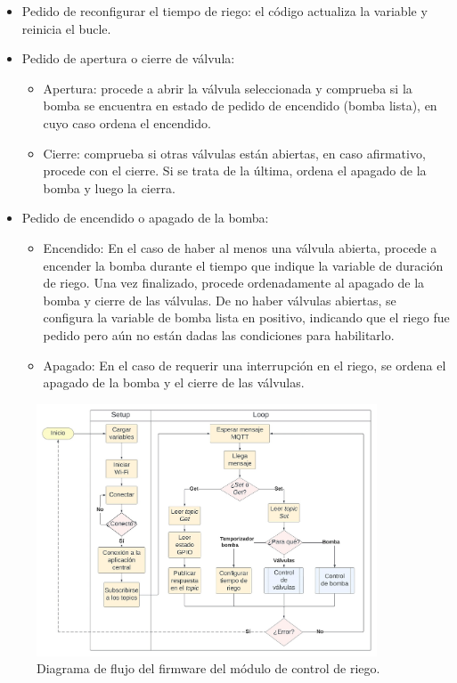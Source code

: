 \begin{itemize}
\item Pedido de reconfigurar el tiempo de riego: el código actualiza la variable y reinicia el bucle.

\item Pedido de apertura o cierre de válvula:
    \begin{itemize}
    \item Apertura: procede a abrir la válvula seleccionada y  comprueba si la bomba se encuentra en estado de pedido de encendido (bomba lista), en cuyo caso ordena el encendido.
    \item Cierre: comprueba si otras válvulas están abiertas, en caso afirmativo, procede con el cierre. Si se trata de la última, ordena el apagado de la bomba y luego la cierra.
    
    \end{itemize}

\item Pedido de encendido o apagado de la bomba:
    \begin{itemize}
    \item Encendido: En el caso de haber al menos una válvula abierta, procede a encender la bomba durante el tiempo que indique la variable de duración de riego. Una vez finalizado, procede ordenadamente al apagado de la bomba y cierre de las válvulas. De no haber válvulas abiertas, se configura la variable de bomba lista en positivo, indicando que el riego fue pedido pero aún no están dadas las condiciones para habilitarlo.
    \item Apagado: En el caso de requerir una interrupción en el riego, se ordena el apagado de la bomba y el cierre de las válvulas.
    
    \end{itemize}



\end{itemize}


\begin{figure}[!h]
	\centering
	\includegraphics[width=0.9\textwidth]{./Figures/chapter3/FirmwareRiegoControl.jpg}
	\caption[Diagrama de flujo del firmware del módulo de control de riego]{Diagrama de flujo del firmware del módulo de control de riego.}
	\label{fig:flow_riegocontrol}
\end{figure}

